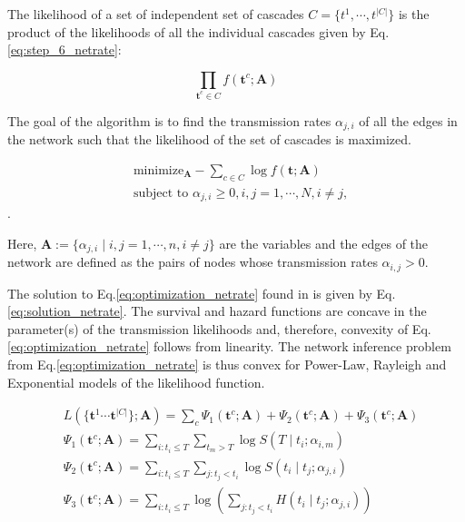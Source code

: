 \documentclass[11pt]{article}
\begin{document}
The likelihood of a set of independent set of cascades $C=\{t^{1},\cdots,t^{|C|}\}$ is the product of the likelihoods of all the individual cascades given by Eq.\ref{eq:step_6_netrate}:

\begin{equation}\label{eq:step_7_netrate}
\prod _{\textbf{t}^{c}\in C}f(\textbf{t}^{c};\textbf{A})
\end{equation}

The goal of the algorithm is to find the transmission rates $\alpha_{j,i}$ of all the edges in the network such that the likelihood of the set of cascades is maximized.

\begin{subequations}
\label{eq:optimization_netrate}
\begin{align}
& \text{minimize}_{\textbf{A}} -\sum_{c\in C}\log f(\textbf{t};\textbf{A})\\
& \text{subject to } \alpha _{j,i}\geq 0,i,j=1,\cdots,N,i\neq j,
\end{align}
\end{subequations}.

Here, $\textbf{A}:=\{\alpha _{j,i}\mid i,j=1,\cdots,n,i\neq j\}$ are the variables and the edges of the network are defined as the pairs of nodes whose transmission rates $\alpha _{i,j}>0$. 

The solution to Eq.\ref{eq:optimization_netrate} found in \cite{rodriguez2011uncovering} is given by Eq.\ref{eq:solution_netrate}. The survival and hazard functions are concave in the parameter(s) of the transmission likelihoods and, therefore, convexity of Eq.\ref{eq:optimization_netrate} follows from linearity. The network inference problem from Eq.\ref{eq:optimization_netrate} is thus convex for Power-Law, Rayleigh and Exponential models of the likelihood function.

\begin{subequations}
\begin{align}
\label{eq:solution_netrate}
& L(\{\textbf{t}^{1}\cdots \textbf{t}^{|C|}\};\textbf{A})=\sum _{c}\Psi_{1}(\textbf{t}^{c};\textbf{A})+\Psi_{2}(\textbf{t}^{c};\textbf{A})+\Psi_{3}(\textbf{t}^{c};\textbf{A})\\
& \Psi_{1}(\textbf{t}^{c};\textbf{A})=\sum _{i:t_{i}\leq T}\sum _{t_{m}>T}\log S(T\mid t_{i};\alpha _{i,m})\\
& \Psi _{2}(\textbf{t}^{c};\textbf{A})=\sum_{i:t_{i}\leq T} \sum_ {j:t_{j}<t_{i}}\log S(t_{i}\mid t_{j};\alpha_{j,i})\\
& \Psi _{3}(\textbf{t}^{c};\textbf{A})=\sum_{i:t_{i}\leq T} \log (\sum_{j:t_{j}<t_{i}} H(t_{i}\mid t_{j};\alpha_{j,i}))
\end{align}
\end{subequations}
\end{document}
